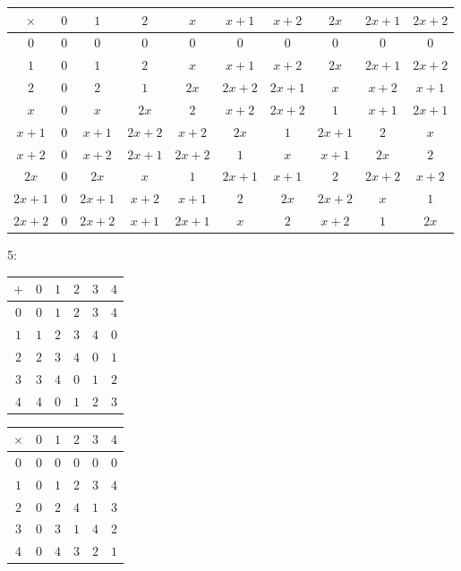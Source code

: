		\begin{center}
			\begin{tabular}{|c|c|c|c|c|c|c|c|c|c|}
				\hline
				$\times $&$ 0 $&$ 1 $&$ 2 $&$ x $&$ x+1 $&$ x+2 $&$ 2x $&$ 2x+1 $&$ 2x+2$\\
				\hline
				$0 $&$ 0 $&$ 0 $&$ 0 $&$ 0 $&$ 0 $&$ 0 $&$ 0 $&$ 0 $&$ 0$\\
				\hline
				$1 $&$ 0 $&$ 1 $&$ 2 $&$ x $&$ x+1 $&$ x+2 $&$ 2x $&$ 2x+1 $&$ 2x+2$\\
				\hline
				$2 $&$ 0 $&$ 2 $&$ 1 $&$ 2x $&$ 2x+2 $&$ 2x+1 $&$ x $&$ x+2 $&$ x+1$\\
				\hline
				$x $&$ 0 $&$ x $&$ 2x $&$ 2 $&$ x+2 $&$ 2x+2 $&$ 1 $&$ x+1 $&$ 2x+1$\\
				\hline
				$x+1 $&$ 0 $&$ x+1 $&$ 2x+2 $&$ x+2 $&$ 2x $&$ 1 $&$ 2x+1 $&$ 2 $&$ x$\\
				\hline
				$x+2 $&$ 0 $&$ x+2 $&$ 2x+1 $&$ 2x+2 $&$ 1 $&$ x $&$ x+1 $&$ 2x $&$ 2$\\
				\hline
				$2x $&$ 0 $&$ 2x $&$ x $&$ 1 $&$ 2x+1 $&$ x+1 $&$ 2 $&$ 2x+2 $&$ x+2$\\
				\hline
				$2x+1 $&$ 0 $&$ 2x+1 $&$ x+2 $&$ x+1 $&$ 2 $&$ 2x $&$ 2x+2 $&$ x $&$ 1$\\
				\hline
				$2x+2 $&$ 0 $&$ 2x+2 $&$ x+1 $&$ 2x+1 $&$ x $&$ 2 $&$ x+2 $&$ 1 $&$ 2x$\\
				\hline
			\end{tabular}
		\end{center}
		5:
		\begin{center}
			\begin{tabular}{|c|c|c|c|c|c|}
				\hline
				$+ $&$ 0 $&$ 1 $&$ 2 $&$ 3 $&$ 4 $\\
				\hline
				$0 $&$ 0 $&$ 1 $&$ 2 $&$ 3 $&$ 4$\\
				\hline
				$1 $&$ 1 $&$ 2 $&$ 3 $&$ 4 $&$ 0$\\
				\hline
				$2 $&$ 2 $&$ 3 $&$ 4 $&$ 0 $&$ 1$\\
				\hline
				$3 $&$ 3 $&$ 4 $&$ 0 $&$ 1 $&$ 2$\\
				\hline
				$4 $&$ 4 $&$ 0 $&$ 1 $&$ 2 $&$ 3$\\
				\hline
			\end{tabular}
		\end{center}
		\begin{center}
			\begin{tabular}{|c|c|c|c|c|c|}
				\hline
				$\times $&$ 0 $&$ 1 $&$ 2 $&$ 3 $&$ 4 $\\
				\hline
				$0 $&$ 0 $&$ 0 $&$ 0 $&$ 0 $&$ 0$\\
				\hline
				$1 $&$ 0 $&$ 1 $&$ 2 $&$ 3 $&$ 4$\\
				\hline
				$2 $&$ 0 $&$ 2 $&$ 4 $&$ 1 $&$ 3$\\
				\hline
				$3 $&$ 0 $&$ 3 $&$ 1 $&$ 4 $&$ 2$\\
				\hline
				$4 $&$ 0 $&$ 4 $&$ 3 $&$ 2 $&$ 1$\\
				\hline
			\end{tabular}
		\end{center}
